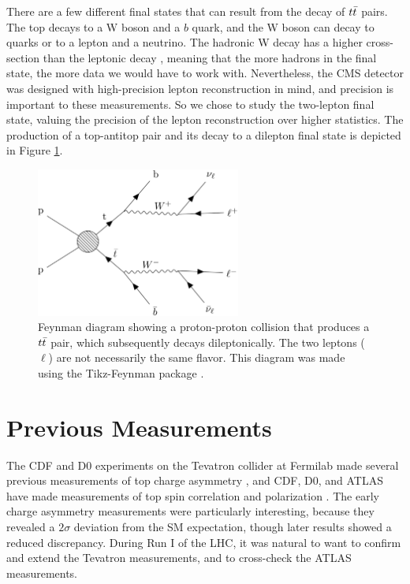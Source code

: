 There are a few different final states that can result from the decay
of $\ttbar$ pairs. The top decays to a W boson and a $b$ quark, and
the W boson can decay to quarks or to a lepton and a neutrino. The
hadronic W decay has a higher cross-section than the leptonic decay \cite{pdg},
meaning that the more hadrons in the final state, the more data we
would have to work with. Nevertheless, the CMS detector was designed
with high-precision lepton reconstruction in mind, and precision is
important to these measurements. So we chose to study the two-lepton
final state, valuing the precision of the lepton reconstruction over
higher statistics. The production of a top-antitop pair and its decay
to a dilepton final state is depicted in Figure
\ref{fig:afb:feynmandiagram}.

\begin{figure}
\centering
\includegraphics[width=0.6\textwidth]{figures/feynmandiagram_afb.pdf}
\caption[Feynman diagram showing a proton-proton collision that
  produces a $\ttbar$ pair, which subsequently decays
  dileptonically. The two leptons ($\ell$) are not necessarily the
  same flavor.]
  {Feynman diagram showing a proton-proton collision that produces
  a $\ttbar$ pair, which subsequently decays dileptonically. The two
  leptons ($\ell$) are not necessarily the same flavor. This
  diagram was made using the Tikz-Feynman package \cite{tikzfeynman}.}
\label{fig:afb:feynmandiagram}
\end{figure}

\section{Previous Measurements}
\label{sec:afb:tevatron}

The CDF and D0 experiments on the Tevatron collider at Fermilab made
several previous measurements of top charge asymmetry
\cite{cdfchargeasym1,cdfchargeasym2,d0chargeasym1,d0chargeasym2}, and %
CDF, D0, and ATLAS have made measurements of top spin correlation and
polarization
\cite{cdfspincorr,d0spincorr1,d0spincorr2,d0pol,atlaspol,atlasspincorr}. The
early charge asymmetry measurements
\cite{cdfchargeasym1,d0chargeasym2} were particularly interesting,
because they revealed a $2\sigma$ deviation from the SM expectation,
though later results \cite{cdfchargeasym2,d0chargeasym2} showed a
reduced discrepancy. During Run I of the LHC, it was natural to want to
confirm and extend the Tevatron measurements, and to cross-check the
ATLAS measurements.

